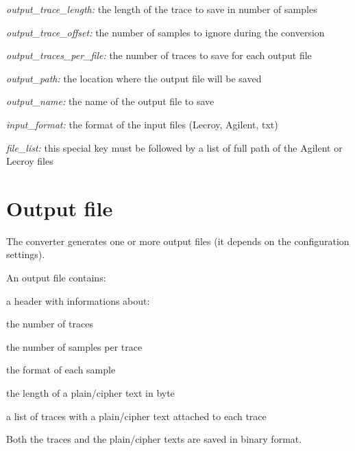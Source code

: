 \begin{DoxyItemize}
\item {\itshape output\_\-trace\_\-length:\/} the length of the trace to save in number of samples \item {\itshape output\_\-trace\_\-offset:\/} the number of samples to ignore during the conversion \item {\itshape output\_\-traces\_\-per\_\-file:\/} the number of traces to save for each output file \item {\itshape output\_\-path:\/} the location where the output file will be saved \item {\itshape output\_\-name:\/} the name of the output file to save \item {\itshape input\_\-format:\/} the format of the input files (Lecroy, Agilent, txt)\end{DoxyItemize}
\begin{DoxyItemize}
\item {\itshape file\_\-list:\/} this special key must be followed by a list of full path of the Agilent or Lecroy files\end{DoxyItemize}
\hypertarget{index_s06}{}\section{Output file}\label{index_s06}
The converter generates one or more output files (it depends on the configuration settings).\par
 An output file contains:\par
 \begin{DoxyItemize}
\item a header with informations about:
\begin{DoxyItemize}
\item the number of traces
\item the number of samples per trace
\item the format of each sample
\item the length of a plain/cipher text in byte 
\end{DoxyItemize}\item a list of traces with a plain/cipher text attached to each trace\end{DoxyItemize}
Both the traces and the plain/cipher texts are saved in binary format.

